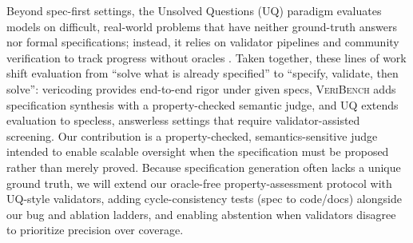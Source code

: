 \documentclass{article}
\begin{document}
Beyond spec-first settings, the Unsolved Questions (UQ) paradigm evaluates models on difficult, real-world problems that have neither ground-truth answers nor formal specifications; instead, it relies on validator pipelines and community verification to track progress without oracles \citep{nie2025uqassessinglanguagemodels}.
Taken together, these lines of work shift evaluation from “solve what is already specified” to “specify, validate, then solve”:
vericoding provides end-to-end rigor under given specs, \textsc{VeriBench} adds specification synthesis with a property-checked semantic judge, and UQ extends evaluation to specless, answerless settings that require validator-assisted screening.
Our contribution is a property-checked, semantics-sensitive judge intended to enable scalable oversight when the specification must be proposed rather than merely proved.
Because specification generation often lacks a unique ground truth, we will extend our oracle-free property-assessment protocol with UQ-style validators, adding cycle-consistency tests (spec to code/docs) alongside our bug and ablation ladders, and enabling abstention when validators disagree to prioritize precision over coverage.
\end{document}
